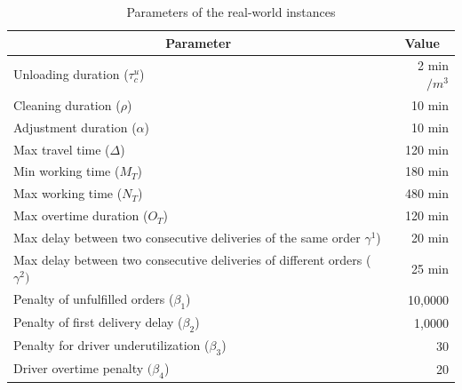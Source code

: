 \documentclass{article}
\begin{document}
\begin{table}[hbt]
    \centering
    \caption{Parameters of the real-world instances}
    \label{tab:problem_parameters}
    \small
    \begin{tabularx}{\textwidth}{Xr}
        \toprule
        \multicolumn{1}{c}{Parameter}                                                 & \multicolumn{1}{c}{Value} \\ \midrule
        Unloading duration ($\tau_c^u$)                                               & 2 min$/m^3$               \\
        Cleaning duration ($\rho$)                                                    & 10 min                    \\
        Adjustment duration ($\alpha$)                                                & 10 min                    \\
        Max travel time ($\Delta$)                                                    & 120 min                   \\
        Min working time ($M_T$)                                                      & 180 min                   \\
        Max working time ($N_T$)                                                      & 480 min                   \\
        Max overtime duration ($O_T$)                                                 & 120 min                   \\
        Max delay between two consecutive deliveries of the same order $\gamma^1$)   & 20 min                    \\
        Max delay between two consecutive deliveries of different orders ($\gamma^2)$ & 25 min                    \\
        Penalty of unfulfilled orders ($\beta_1$)                                     & 10,0000                   \\
        Penalty of first delivery delay ($\beta_2$)                                   & 1,0000                    \\
        Penalty for driver underutilization  ($\beta_3$)                              & 30                        \\
        Driver overtime penalty $ (\beta_4$)                                          & 20                        \\
        \bottomrule
    \end{tabularx}
\end{table}
\end{document}
